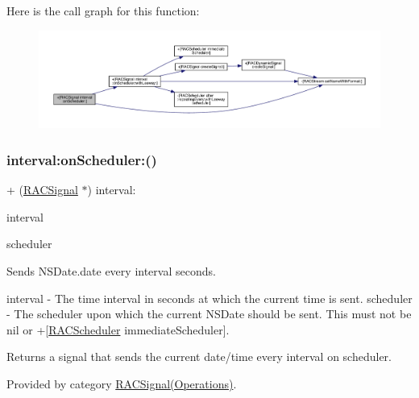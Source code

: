 Here is the call graph for this function\+:\nopagebreak
\begin{figure}[H]
\begin{center}
\leavevmode
\includegraphics[width=350pt]{interface_r_a_c_signal_a65442f423ebf08b9217f7bb206780a45_cgraph}
\end{center}
\end{figure}
\mbox{\label{interface_r_a_c_signal_a65442f423ebf08b9217f7bb206780a45}} 
\subsubsection{\texorpdfstring{interval\+:on\+Scheduler\+:()}{interval:onScheduler:()}\hspace{0.1cm}{\footnotesize\ttfamily [2/3]}}
{\footnotesize\ttfamily + (\mbox{\hyperlink{interface_r_a_c_signal}{R\+A\+C\+Signal}} $\ast$) interval\+: \begin{DoxyParamCaption}\item[{(N\+S\+Time\+Interval)}]{interval }\item[{onScheduler:(\mbox{\hyperlink{interface_r_a_c_scheduler}{R\+A\+C\+Scheduler}} $\ast$)}]{scheduler }\end{DoxyParamCaption}}

Sends N\+S\+Date.\+date every {\ttfamily interval} seconds.

interval -\/ The time interval in seconds at which the current time is sent. scheduler -\/ The scheduler upon which the current N\+S\+Date should be sent. This must not be nil or +\mbox{[}\mbox{\hyperlink{interface_r_a_c_scheduler}{R\+A\+C\+Scheduler}} immediate\+Scheduler\mbox{]}.

Returns a signal that sends the current date/time every {\ttfamily interval} on {\ttfamily scheduler}. 

Provided by category \mbox{\hyperlink{category_r_a_c_signal_07_operations_08_a65442f423ebf08b9217f7bb206780a45}{R\+A\+C\+Signal(\+Operations)}}.

